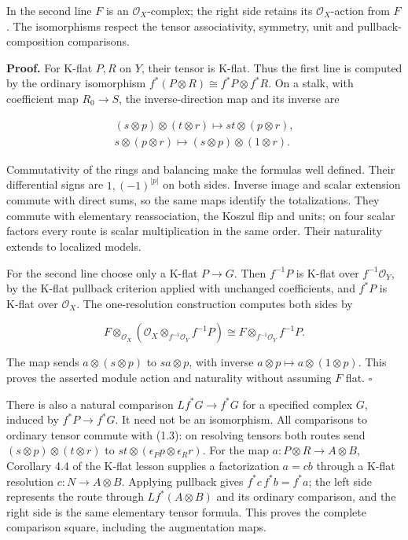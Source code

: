\documentclass[
  english,
  11pt,
  a4paper,
]{article}
\begin{document}
In the second line \(F\) is an \(\mathcal O_X\)-complex; the right side
retains its \(\mathcal O_X\)-action from \(F\). The isomorphisms respect
the tensor associativity, symmetry, unit and pullback-composition
comparisons.

\textbf{Proof.} For K-flat \(P,R\) on \(Y\), their tensor is K-flat.
Thus the first line is computed by the ordinary isomorphism
\(f^*(P\otimes R)\cong f^*P\otimes f^*R\). On a stalk, with coefficient
map \(R_0\to S\), the inverse-direction map and its inverse are

\[\begin{gathered}
(s\otimes p)\otimes(t\otimes r)\longmapsto st\otimes(p\otimes r),\\
s\otimes(p\otimes r)\longmapsto(s\otimes p)\otimes(1\otimes r).
\end{gathered}\]

Commutativity of the rings and balancing make the formulas well defined.
Their differential signs are \(1,(-1)^{|p|}\) on both sides. Inverse
image and scalar extension commute with direct sums, so the same maps
identify the totalizations. They commute with elementary reassociation,
the Koszul flip and units; on four scalar factors every route is scalar
multiplication in the same order. Their naturality extends to localized
models.

For the second line choose only a K-flat \(P\to G\). Then \(f^{-1}P\) is
K-flat over \(f^{-1}\mathcal O_Y\), by the K-flat pullback criterion
applied with unchanged coefficients, and \(f^*P\) is K-flat over
\(\mathcal O_X\). The one-resolution construction computes both sides by

\[F\otimes_{\mathcal O_X}
(\mathcal O_X\otimes_{f^{-1}\mathcal O_Y}f^{-1}P)
\cong F\otimes_{f^{-1}\mathcal O_Y}f^{-1}P.\]

The map sends \(a\otimes(s\otimes p)\) to \(sa\otimes p\), with inverse
\(a\otimes p\mapsto a\otimes(1\otimes p)\). This proves the asserted
module action and naturality without assuming \(F\) flat. \(\square\)

There is also a natural comparison \(Lf^*G\to f^*G\) for a specified
complex \(G\), induced by \(f^*P\to f^*G\). It need not be an
isomorphism. All comparisons to ordinary tensor commute with (1.3): on
resolving tensors both routes send \((s\otimes p)\otimes(t\otimes r)\)
to \(st\otimes(\epsilon_Pp\otimes\epsilon_Rr)\). For the map
\(a:P\otimes R\to A\otimes B\), Corollary 4.4 of the K-flat lesson
supplies a factorization \(a=cb\) through a K-flat resolution
\(c:N\to A\otimes B\). Applying pullback gives \(f^*c\,f^*b=f^*a\); the
left side represents the route through \(Lf^*(A\otimes B)\) and its
ordinary comparison, and the right side is the same elementary tensor
formula. This proves the complete comparison square, including the
augmentation maps.
\end{document}
